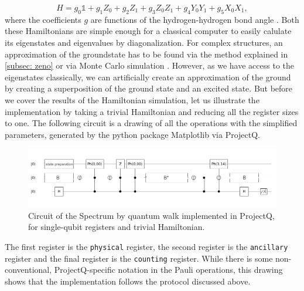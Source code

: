 \begin{equation}
H=g_{0} \mathbb{1}+g_{1} Z_{0}+g_{2} Z_{1}+g_{3} Z_{0} Z_{1}+g_{4} Y_{0} Y_{1}+g_{5} X_{0} X_{1},
\end{equation} where the coefficients $g$ are functions of the hydrogen-hydrogen bond angle \cite{malley}. Both these Hamiltonians are simple enough for a classical computer to easily calulate its eigenstates and eigenvalues by diagonalization. For complex structures, an approximation of the groundstate has to be found via the method explained in \ref{subsec: zeno} or via Monte Carlo simulation \cite{poulin}. However, as we have access to the eigenstates classically, we can artificially create an approximation of the ground by creating a superposition of the ground state and an excited state. But before we cover the results of the Hamiltonian simulation, let us illustrate the implementation by taking a trivial Hamiltonian and reducing all the register sizes to one. The following circuit is a drawing of all the operations with the simplified parameters, generated by the python package Matplotlib via ProjectQ.

\begin{figure}[h]
  \center \includegraphics[width = \textwidth]{circuit.png}
  \caption{Circuit of the Spectrum by quantum walk implemented in ProjectQ, for single-qubit registers and trivial Hamiltonian.}
\end{figure}

The first register is the \verb|physical| register, the second register is the \verb|ancillary| register and the final register is the \verb|counting| register. While there is some non-conventional, ProjectQ-specific notation in the Pauli operations, this drawing shows that the implementation follows the protocol discussed above.

